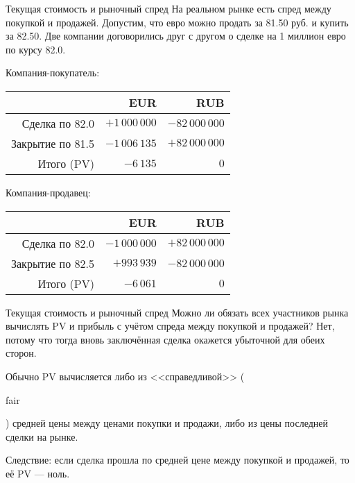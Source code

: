 \documentclass{beamer}
\newcommand{\en}[1]{\begin{otherlanguage}{english}#1\end{otherlanguage}}
\begin{document}
\begin{frame}{Текущая стоимость и рыночный спред}
\justify
На реальном рынке есть спред между покупкой и продажей. Допустим, что евро можно продать за 81.50 руб. и купить за 82.50. Две компании договорились друг с другом о сделке на 1 миллион евро по курсу 82.0.

\justify
Компания-покупатель:

\centering
\begin{tabular}{r|r|r}
                & EUR                   & RUB \\ \hline
Сделка по 82.0  & $+1\,000\,000$ & $-82\,000\,000$ \\
Закрытие по 81.5 & $-1\,006\,135$ & $+82\,000\,000$ \\ \hline
Итого (PV)       &      $-6\,135$ & $0$
\end{tabular}

\justify
Компания-продавец:

\centering
\begin{tabular}{r|r|r}
                 & EUR                   & RUB \\ \hline
Сделка по 82.0   & $-1\,000\,000$ & $+82\,000\,000$ \\
Закрытие по 82.5 &    $+993\,939$ & $-82\,000\,000$ \\ \hline
Итого (PV)       &      $-6\,061$ & $0$
\end{tabular} 
\end{frame}



\begin{frame}{Текущая стоимость и рыночный спред}
\justify
Можно ли обязать всех участников рынка вычислять PV и прибыль с учётом спреда между покупкой и продажей? Нет, потому что тогда вновь заключённая сделка окажется убыточной для обеих сторон.

\justify
Обычно PV вычисляется либо из <<справедливой>> (\en{fair}) средней цены между ценами покупки и продажи, либо из цены последней сделки на рынке. 

\justify
Следствие: если сделка прошла по средней цене между покупкой и продажей, то её PV --- ноль.
\end{frame}
\end{document}
